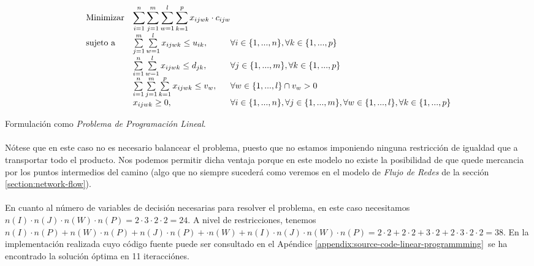 \documentclass{article}
\begin{document}
    \begin{eqfloat}
      \begin{equation}
        \begin{array}{ll@{}ll}
          \text{Minimizar}	& \displaystyle \sum\limits_{i=1}^{n}\sum\limits_{j=1}^{m}\sum\limits_{w=1}^{l}\sum\limits_{k=1}^{p} x_{ijwk} \cdot c_{ijw} \\
          \text{sujeto a}		& \sum\limits_{j=1}^{m}\sum\limits_{w=1}^{l} x_{ijwk}	\leq u_{ik}, 		& \forall i \in \{1,...,n\}, \forall k \in \{1,...,p\}\\
                            &	\sum\limits_{i=1}^{n}\sum\limits_{w=1}^{l} x_{ijwk}	\leq d_{jk}, 		& \forall j \in \{1,...,m\}, \forall k \in \{1,...,p\}\\
                            &	\sum\limits_{i=1}^{n}\sum\limits_{j=1}^{m}\sum\limits_{k=1}^{p} x_{ijwk}	\leq v_{w}, 		& \forall w \in \{1,...,l\}  \cap v_{w} > 0 \\
                            & x_{ijwk}	\geq 0, 	& \forall i \in \{1,...,n\}, \forall j \in \{1,...,m\}, \forall w \in \{1,...,l\}, \forall k \in \{1,...,p\}
        \end{array}
      \end{equation}
      \caption{Formulación como \emph{Problema de Programación Lineal}.}
      \label{eq:linear-programming-model}
    \end{eqfloat}

    \paragraph{}
    Nótese que en este caso no es necesario balancear el problema, puesto que no estamos imponiendo ninguna restricción de igualdad que  a transportar todo el producto. Nos podemos permitir dicha ventaja porque en este modelo no existe la posibilidad de que quede mercancia por los puntos intermedios del camino (algo que no siempre sucederá como veremos en el modelo de \emph{Flujo de Redes} de la sección \ref{section:network-flow}).

    \paragraph{}
    En cuanto al número de variables de decisión necesarias para resolver el problema, en este caso necesitamos $n(I) \cdot n(J) \cdot n(W) \cdot n(P) = 2 \cdot 3 \cdot 2 \cdot 2 = 24$. A nivel de restricciones, tenemos $n(I) \cdot n(P) + n(W) \cdot n(P) + n(J) \cdot n(P) + \cdot n(W) + n(I) \cdot n(J) \cdot n(W) \cdot n(P) = 2 \cdot 2 + 2 \cdot 2 + 3 \cdot 2 + 2 \cdot 3 \cdot 2 \cdot 2 = 38$. En la implementación realizada cuyo código fuente puede ser consultado en el Apéndice \ref{appendix:source-code-linear-programmming} se ha encontrado la solución óptima en 11 iteracciónes.
\end{document}
